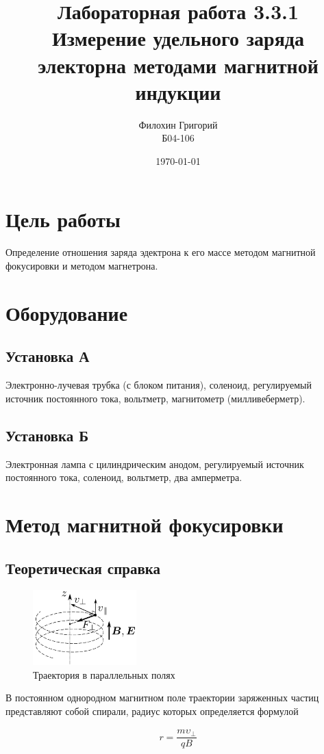 \documentclass[a4paper]{article}
\author{Филохин Григорий\\Б04-106}
\title{Лабораторная работа 3.3.1\\Измерение удельного заряда электорна методами магнитной индукции}
\date{\today}
\begin{document}
\maketitle
\newpage

\section*{Цель работы}
Определение отношения заряда эдектрона к его массе методом магнитной фокусировки и методом магнетрона.

\section*{Оборудование}
\subsection*{Установка А}
Электронно-лучевая трубка (с блоком питания), соленоид, регулируемый источник постоянного тока, вольтметр,
магнитометр (милливеберметр).
\subsection*{Установка Б}
Электронная лампа с цилиндрическим анодом, регулируемый источник постоянного тока,
соленоид, вольтметр, два амперметра.


\section*{Метод магнитной фокусировки}

\subsection*{Теоретическая справка}

\begin{figure}
\includegraphics[width = 4cm]{Траектория}
\caption{Траектория в параллельных полях}
\end{figure}
В постоянном однородном магнитном поле траектории заряжен­ных частиц представляют собой спирали, радиус которых определя­ется формулой

\begin{align}
	r = \dfrac{m \upsilon_\perp}{q B}
\end{align}
\end{document}
